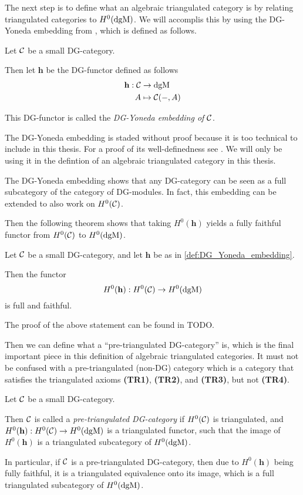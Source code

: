 The next step is to define what an algebraic triangulated category is by relating triangulated categories to \( H^0(\operatorname{dgM}) \). We will accomplis this by using the DG-Yoneda embedding from \cite[Corollary 6.3.6]{Borceux_1994}, which is defined as follows.
\begin{definition}
    \label{def:DG_Yoneda_embedding}
    Let \( {\mathcal{C}} \) be a small DG-category.
    
    Then let \( \mathbf{h} \) be the DG-functor defined as follows
    \begin{align*}
        \mathbf{h}: {\mathcal{C}} &\to \operatorname{dgM} \\
        A &\mapsto {\mathcal{C}}(-, A)
    \end{align*}

    This DG-functor is called the \emph{DG-Yoneda embedding of \( {\mathcal{C}} \)}.
\end{definition}

The DG-Yoneda embedding is staded without proof because it is too technical to include in this thesis. For a proof of its well-definedness see \cite[Corollary 6.3.6]{Borceux_1994}. We will only be using it in the defintion of an algebraic triangulated category in this thesis.

The DG-Yoneda embedding shows that any DG-category can be seen as a full subcategory of the category of DG-modules. In fact, this embedding can be extended to also work on \( H^0({\mathcal{C}}) \).

Then the following theorem shows that taking \( H^0(\mathbf{h}) \) yields a fully faithful functor from \( H^0({\mathcal{C}}) \) to \( H^0(\operatorname{dgM}) \).

\begin{theorem}
    Let \( {\mathcal{C}} \) be a small DG-category, and let \( \mathbf{h} \) be as in \autoref{def:DG_Yoneda_embedding}.

    Then the functor
    \[
        H^0(\mathbf{h}): H^0({\mathcal{C}}) \to H^0(\operatorname{dgM})
    \]
    is full and faithful.
\end{theorem}
The proof of the above statement can be found in TODO.

Then we can define what a ``pre-triangulated DG-category'' is, which is the final important piece in this definition of algebraic triangulated categories. It must not be confused with a pre-triangulated (non-DG) category which is a category that satisfies the triangulated axioms {\bf (TR1)}, {\bf (TR2)}, and {\bf (TR3)}, but not {\bf (TR4)}.
\begin{definition}
    \label{def:pre-tri_dg_cat}
    Let \( {\mathcal{C}} \) be a small DG-category.

    Then \( {\mathcal{C}} \) is called a \emph{pre-triangulated DG-category} if \( H^0({\mathcal{C}}) \) is triangulated, and \( H^0(\mathbf{h}): H^0({\mathcal{C}}) \to H^0(\operatorname{dgM}) \) is a triangulated functor, such that the image of \( H^0(\mathbf{h}) \) is a triangulated subcategory of \( H^0(\operatorname{dgM}) \).
\end{definition}
In particular, if \( {\mathcal{C}} \) is a pre-triangulated DG-category, then due to \( H^0(\mathbf{h}) \) being fully faithful, it is a triangulated equivalence onto its image, which is a full triangulated subcategory of \( H^0(\operatorname{dgM}) \).

